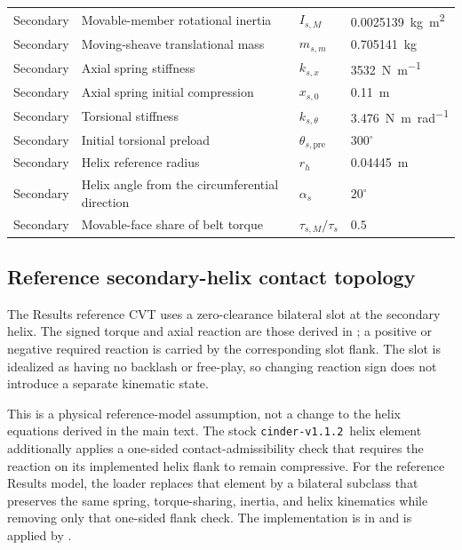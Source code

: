 \documentclass[11pt]{report}
\numberwithin{equation}{section}
\newcommand{\CINDERtag}{\texttt{cinder-v1.1.2}}
\newcounter{assump}
\begin{document}
\begin{center}
\begin{longtable}{@{}>{\raggedright\arraybackslash}p{}>{\raggedright\arraybackslash}p{}>{\raggedright\arraybackslash}p{}>{\raggedleft\arraybackslash}p{}@{}}
Secondary & Movable-member rotational inertia & $I_{s,M}$ & \SI{0.0025139}{\kilogram\meter\squared} \\[3pt]
Secondary & Moving-sheave translational mass & $m_{s,m}$ & \SI{0.705141}{\kilogram} \\[3pt]
Secondary & Axial spring stiffness & $k_{s,x}$ & \SI{3532}{\newton\per\meter} \\[3pt]
Secondary & Axial spring initial compression & $x_{s,0}$ & \SI{0.11}{\meter} \\[3pt]
Secondary & Torsional stiffness & $k_{s,\theta}$ & \SI{3.476}{\newton\meter\per\radian} \\[3pt]
Secondary & Initial torsional preload & $\theta_{s,\mathrm{pre}}$ & $300^\circ$ \\[3pt]
Secondary & Helix reference radius & $r_h$ & \SI{0.04445}{\meter} \\[3pt]
Secondary & Helix angle from the circumferential direction & $\alpha_s$ & $20^\circ$ \\[3pt]
Secondary & Movable-face share of belt torque & $\tau_{s,M}/\tau_s$ & $0.5$ \\
\end{longtable}
\normalsize
\end{center}

\subsection{Reference secondary-helix contact topology}
\label{app:reference_helix_topology}

The Results reference CVT uses a zero-clearance bilateral slot at the secondary
helix. The signed torque and axial reaction are those derived in
; a
positive or negative required reaction is carried by the corresponding slot
flank. The slot is idealized as having no backlash or free-play, so changing
reaction sign does not introduce a separate kinematic state.

This is a physical reference-model assumption, not a change to the helix
equations derived in the main text. The stock \CINDERtag\ helix element additionally applies a one-sided
contact-admissibility check that requires the reaction on its implemented helix
flank to remain compressive. For the reference Results model, the loader
replaces that element by a bilateral subclass that preserves the same spring,
torque-sharing, inertia, and helix kinematics while removing only that
one-sided flank check. The implementation is
in
and is applied by
.
\end{document}
